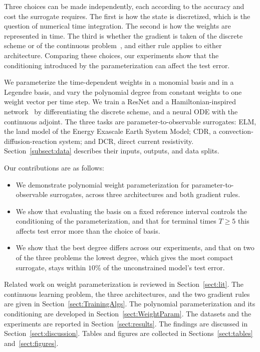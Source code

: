 \documentclass[pdflatex,sn-mathphys-num]{sn-jnl}%
\theoremstyle{thmstyleone}%
\theoremstyle{thmstyletwo}%
\theoremstyle{thmstylethree}%
\begin{document}
Three choices can be made independently, each according to the accuracy and cost the surrogate requires.
%
The first is how the state is discretized, which is the question of numerical time integration.
%
The second is how the weights are represented in time.
%
The third is whether the gradient is taken of the discrete scheme or of the continuous problem~\cite{discoptvsoptdisc}, and either rule applies to either architecture.
%
Comparing these choices, our experiments show that the conditioning introduced by the parameterization can affect the test error.

We parameterize the time-dependent weights in a monomial basis and in a Legendre basis, and vary the polynomial degree from constant weights to one weight vector per time step.
%
We train a ResNet and a Hamiltonian-inspired network~\cite{HaberRuthotto2017} by differentiating the discrete scheme, and a neural ODE with the continuous adjoint.
%
The three tasks are parameter-to-observable surrogates: ELM, the land model of the Energy Exascale Earth System Model; CDR, a convection-diffusion-reaction system; and DCR, direct current resistivity.
%
Section~\ref{subsect:data} describes their inputs, outputs, and data splits.

Our contributions are as follows:
\begin{itemize}
    \item We demonstrate polynomial weight parameterization for parameter-to-observable surrogates, across three architectures and both gradient rules.
    \item We show that evaluating the basis on a fixed reference interval controls the conditioning of the parameterization, and that for terminal times $T\ge5$ this affects test error more than the choice of basis. 
    \item We show that the best degree differs across our experiments, and that on two of the three problems the lowest degree, which gives the most compact surrogate, stays within $10\%$ of the unconstrained model's test error.
\end{itemize}

Related work on weight parameterization is reviewed in Section~\ref{sect:lit}.
%
The continuous learning problem, the three architectures, and the two gradient rules are given in Section~\ref{sect:TrainingAlgs}.
%
The polynomial parameterization and its conditioning are developed in Section~\ref{sect:WeightParam}.
%
The datasets and the experiments are reported in Section~\ref{sect:results}.
%
The findings are discussed in Section~\ref{sect:discussion}.
%
Tables and figures are collected in Sections~\ref{sect:tables} and~\ref{sect:figures}.
\end{document}
